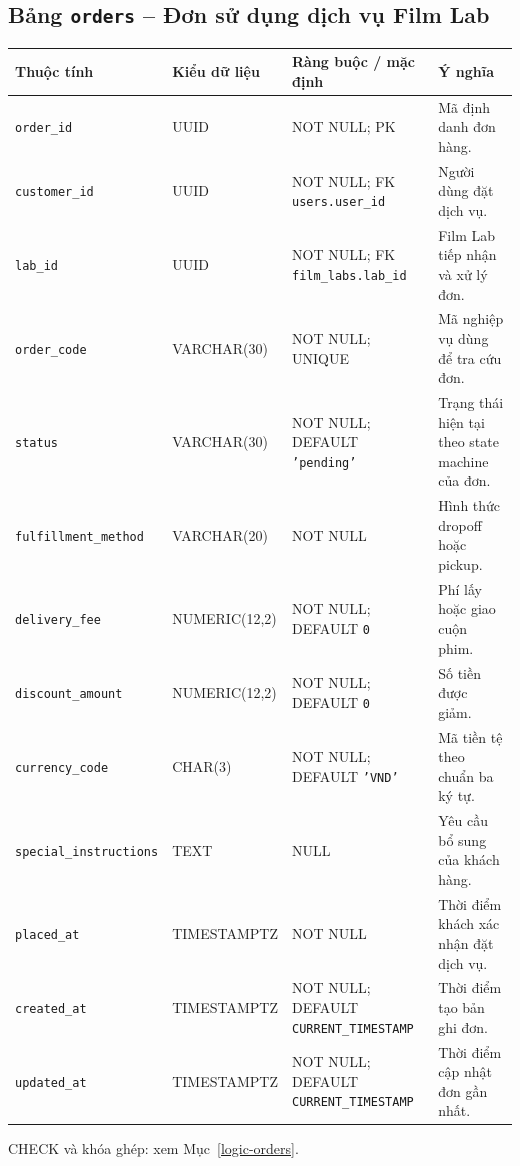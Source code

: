 \subsection{Bảng \texttt{orders} -- Đơn sử dụng dịch vụ Film Lab}
\label{dictionary-orders}
\begingroup
\footnotesize
\setlength{\tabcolsep}{3pt}
\begin{longtable}{>{\raggedright\arraybackslash}p{3.1cm}>{\raggedright\arraybackslash}p{2.5cm}>{\raggedright\arraybackslash}p{3.7cm}>{\raggedright\arraybackslash}p{4.3cm}}
\toprule
Thuộc tính & Kiểu dữ liệu & Ràng buộc / mặc định & Ý nghĩa \\
\midrule
\endhead
\texttt{order\_\allowbreak{}id} & UUID & NOT NULL; PK & Mã định danh đơn hàng. \\
\texttt{customer\_\allowbreak{}id} & UUID & NOT NULL; FK \texttt{users.user\_\allowbreak{}id} & Người dùng đặt dịch vụ. \\
\texttt{lab\_\allowbreak{}id} & UUID & NOT NULL; FK \texttt{film\_\allowbreak{}labs.lab\_\allowbreak{}id} & Film Lab tiếp nhận và xử lý đơn. \\
\texttt{order\_\allowbreak{}code} & VARCHAR(30) & NOT NULL; UNIQUE & Mã nghiệp vụ dùng để tra cứu đơn. \\
\texttt{status} & VARCHAR(30) & NOT NULL; DEFAULT \texttt{'pending'} & Trạng thái hiện tại theo state machine của đơn. \\
\texttt{fulfillment\_\allowbreak{}method} & VARCHAR(20) & NOT NULL & Hình thức dropoff hoặc pickup. \\
\texttt{delivery\_\allowbreak{}fee} & NUMERIC(12,2) & NOT NULL; DEFAULT \texttt{0} & Phí lấy hoặc giao cuộn phim. \\
\texttt{discount\_\allowbreak{}amount} & NUMERIC(12,2) & NOT NULL; DEFAULT \texttt{0} & Số tiền được giảm. \\
\texttt{currency\_\allowbreak{}code} & CHAR(3) & NOT NULL; DEFAULT \texttt{'VND'} & Mã tiền tệ theo chuẩn ba ký tự. \\
\texttt{special\_\allowbreak{}instructions} & TEXT & NULL & Yêu cầu bổ sung của khách hàng. \\
\texttt{placed\_\allowbreak{}at} & TIMESTAMPTZ & NOT NULL & Thời điểm khách xác nhận đặt dịch vụ. \\
\texttt{created\_\allowbreak{}at} & TIMESTAMPTZ & NOT NULL; DEFAULT \texttt{CURRENT\_\allowbreak{}TIMESTAMP} & Thời điểm tạo bản ghi đơn. \\
\texttt{updated\_\allowbreak{}at} & TIMESTAMPTZ & NOT NULL; DEFAULT \texttt{CURRENT\_\allowbreak{}TIMESTAMP} & Thời điểm cập nhật đơn gần nhất. \\
\bottomrule
\end{longtable}
\endgroup
CHECK và khóa ghép: xem Mục~\ref{logic-orders}.
